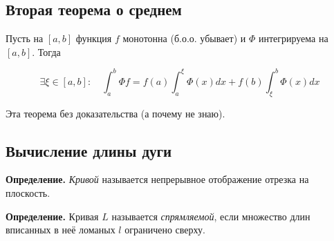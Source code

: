 \documentclass[a4paper]{article}
\begin{document}
\begin{definit}
\subsection*{Вторая теорема о среднем}
Пусть на $[a,b]$ функция $f$ монотонна (б.о.о. убывает) и $\Phi$ интегрируема на $[a,b]$. Тогда

\[
\exists \xi \in [a,b]: \quad \int_a^b \Phi f = f(a) \int_a^{\xi} \Phi(x)dx + f(b) \int_{\xi}^b\Phi(x)dx
\]

Эта теорема без доказательства (а почему не знаю).
\end{definit}

\begin{definit}

\subsection*{Вычисление длины дуги}

\textbf{Определение.} \textit{Кривой} называется непрерывное отображение отрезка на плоскость.

\textbf{Определение.}  Кривая $L$ называется \textit{спрямляемой}, если множество длин вписанных в неё ломаных $l$ ограничено сверху.
\end{definit}
\end{document}
